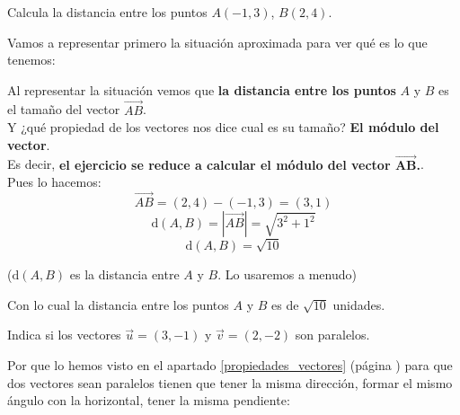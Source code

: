 \documentclass[a4paper,11pt,answers]{exam}
\newcommand\distancia[2]{\text{d}(#1,#2)}
\begin{document}
\begin{questions}
\question Calcula la distancia entre los puntos $A(-1, 3)$, $B(2, 4)$.
  \begin{solution}
    Vamos a representar primero la situación aproximada para ver qué es lo que tenemos:
    \begin{center}
    \end{center}
    Al representar la situación vemos que \textbf{la distancia entre los puntos} $A$ y $B$ es el
    tamaño del vector $\overrightarrow{AB}$.\\
    Y ¿qué propiedad de los vectores nos dice cual es su tamaño? \textbf{El módulo del vector}.\\

    Es decir, \textbf{el ejercicio se reduce a calcular el módulo del vector $\boldsymbol{
        \overrightarrow{AB}}$.}.\\

    Pues lo hacemos:
    \[\overrightarrow{AB} = (2, 4) - (-1, 3) = (3, 1)\]
    \[\distancia{A}{B} = |\overrightarrow{AB}| = \sqrt{3^2 + 1^2}\]
    \[\distancia{A}{B} = \sqrt{10}\]
    \begin{center}
      \small{($\distancia{A}{B}$ es la distancia entre $A$ y $B$. Lo usaremos a menudo)}
    \end{center}

    Con lo cual la distancia entre los puntos $A$ y $B$ es de $\sqrt{10}$ unidades.
  \end{solution}
\question Indica si los vectores $\vec{u} = (3, -1)$ y $\vec{v} = (2, -2)$ son paralelos.
  \begin{solution}
    Por que lo hemos visto en el apartado \ref{propiedades_vectores}
    (página \pageref{propiedades_vectores}) para que dos vectores sean paralelos tienen que tener
    la misma dirección, formar el mismo ángulo con la horizontal, tener la misma pendiente:
    \begin{center}
    \end{center}


\end{solution}
\end{questions}
\end{document}

